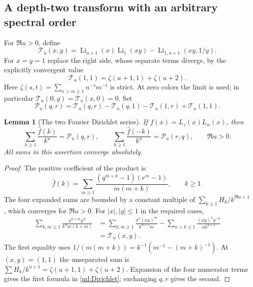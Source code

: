 \documentclass[11pt]{article}
\numberwithin{equation}{section}
\theoremstyle{plain}
\newtheorem{lemma}[theorem]{Lemma}
\theoremstyle{definition}
\theoremstyle{remark}
\DeclareMathOperator{\Li}{Li}
\begin{document}
\subsection{A depth-two transform with an arbitrary spectral order}

For $\Re u>0$, define
\begin{equation}\label{ml:Tu}
 \mathcal T_u(x,y)
       =\Li_{u+1}(x)\Li_1(xy)
                              -\Li_{1,u+1}(xy,1/y).
\end{equation}
For $x=y=1$ replace the right side, whose separate terms diverge, by
the explicitly convergent value
\begin{equation}\label{ml:T11}
       \mathcal T_u(1,1)=\zeta(u+1,1)+\zeta(u+2).
\end{equation}
Here $\zeta(s,t)=\sum_{n>m\ge1}n^{-s}m^{-t}$ is strict. At zero
colors the limit is used; in particular $\mathcal T_u(0,y)=
\mathcal T_u(x,0)=0$. Set
\begin{equation}\label{ml:Pu}
 \mathcal P_u(q,r)=\mathcal T_u(q,r)-\mathcal T_u(q,1)
                              -\mathcal T_u(1,r)+\mathcal T_u(1,1).
\end{equation}

\begin{lemma}[The two Fourier Dirichlet series]
\label{ml:coefficient}
If $f(x)=L_z(x)L_w(x)$, then
\begin{equation}\label{ml:Dirichlet}
 \sum_{k\ge1}\frac{\widehat f(k)}{k^u}=\mathcal P_u(q,r),\qquad
 \sum_{k\ge1}\frac{\widehat f(-k)}{k^u}=\mathcal P_u(r,q),
                          \qquad\Re u>0.
\end{equation}
All sums in this assertion converge absolutely.
\end{lemma}

\begin{proof}
The positive coefficient of the product is
\[
 \widehat f(k)=\sum_{m\ge1}
          \frac{(q^{m+k}-1)(r^m-1)}{m(m+k)},\qquad k\ge1.
\]
The four expanded sums are bounded by a constant multiple of
$\sum_{k\ge1}H_k/k^{\Re u+1}$, which converges for $\Re u>0$.
For $|x|,|y|\le1$ in the required cases,
\begin{align*}
 \sum_{k,m\ge1}\frac{x^{k+m}y^m}{k^um(k+m)}
 &=\sum_{k,m\ge1}\frac{x^k(xy)^m}{k^{u+1}m}
       -\sum_{n>k\ge1}\frac{(xy)^ny^{-k}}{nk^{u+1}}\\
 &=\mathcal T_u(x,y).
\end{align*}
The first equality uses
$1/(m(m+k))=k^{-1}(m^{-1}-(m+k)^{-1})$.
At $(x,y)=(1,1)$ the unseparated sum is
$\sum H_k/k^{u+1}=\zeta(u+1,1)+\zeta(u+2)$.
Expansion of the four numerator terms gives the first formula in
\eqref{ml:Dirichlet}; exchanging $q,r$ gives the second.
\end{proof}
\end{document}
